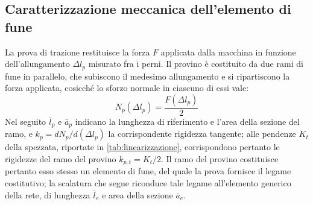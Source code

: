 \subsection{Caratterizzazione meccanica dell'elemento di fune}
\label{sec:caratterizzazione_elemento}

La prova di trazione restituisce la forza $F$ applicata dalla macchina in funzione dell'allungamento $\Delta l_p$ misurato fra i perni. Il provino è costituito da due rami di fune in parallelo, che subiscono il medesimo allungamento e si ripartiscono la forza applicata, cosicché lo sforzo normale in ciascuno di essi vale:
\begin{equation}
    N_p(\Delta l_p) = \frac{F(\Delta l_p)}{2}
    \label{eq:N_provino}
\end{equation}
Nel seguito $\overline{l}_p$ e $\bar{a}_p$ indicano la lunghezza di riferimento e l'area della sezione del ramo, e $k_p = dN_p/d(\Delta l_p)$ la corrispondente rigidezza tangente; alle pendenze $K_t$ della spezzata, riportate in \cref{tab:linearizzazione}, corrispondono pertanto le rigidezze del ramo del provino $k_{p,t} = K_t/2$. Il ramo del provino costituisce pertanto esso stesso un elemento di fune, del quale la prova fornisce il legame costitutivo; la scalatura che segue riconduce tale legame all'elemento generico della rete, di lunghezza $\overline{l}_e$ e area della sezione $\overline{a}_e$.

